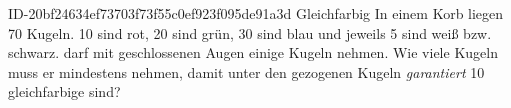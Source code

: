 \begin{exercise}
      {ID-20bf24634ef73703f73f55c0ef923f095de91a3d}
      {Gleichfarbig}
  \ifproblem\problem
    In einem Korb liegen 70 Kugeln. 10 sind rot, 20 sind grün, 30 sind blau
    und jeweils 5 sind weiß bzw. schwarz. \xya{} darf mit geschlossenen Augen
    einige Kugeln nehmen. Wie viele Kugeln muss er mindestens nehmen, damit
    unter den gezogenen Kugeln \emph{garantiert} 10 gleichfarbige sind?
  \fi
\end{exercise}

%

